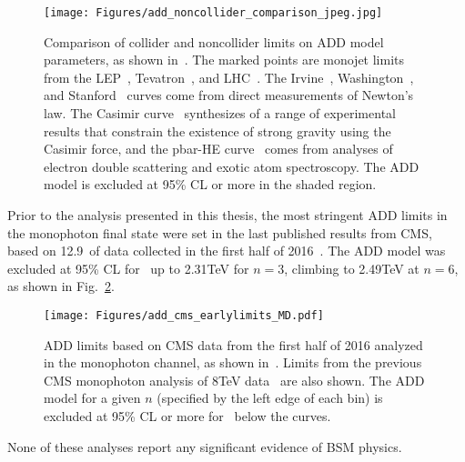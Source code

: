 \begin{figure}[hbtp]
  \begin{center}
    \texttt{[image: Figures/add\_noncollider\_comparison\_jpeg.jpg]}
    \caption{
      Comparison of collider and noncollider limits on ADD model parameters, as shown in~\cite{ref:0264-9381/32/3/033001}.
      The marked points are monojet limits from the LEP~\cite{ref:9789812702227_0266}, Tevatron~\cite{ref:PhysRevLett.101.181602}, and LHC~\cite{ref:j.physletb.2011.10.006, ref:PhysRevLett.110.011802, ref:0264-9381/32/3/033001}.
      The Irvine~\cite{ref:PhysRevD.32.3084, ref:PhysRevLett.44.1645}, Washington~\cite{ref:PhysRevLett.98.021101}, and Stanford~\cite{ref:PhysRevD.78.022002} curves come from direct measurements of Newton's law.
      The Casimir curve~\cite{ref:0264-9381/32/3/033001} synthesizes of a range of  experimental results that constrain the existence of strong gravity using the Casimir force,
      and the pbar-HE curve~\cite{ref:epjconf/20146605021, ref:0264-9381/32/3/033001} comes from analyses of electron double scattering and exotic atom spectroscopy.
      The ADD model is excluded at 95\% CL or more in the shaded region.
    }
    \label{fig:add_noncollider_comparison}
  \end{center}
\end{figure}

Prior to the analysis presented in this thesis, the most stringent ADD limits in the monophoton final state were set in the last published results from CMS,
based on 12.9\fbinv\ of data collected in the first half of 2016~\cite{ref:JHEP10(2017)073}. The ADD model was excluded at 95\% CL for \mD\ up to 2.31\unit{TeV}
for $n = 3$, climbing to 2.49\unit{TeV} at $n = 6$, as shown in Fig.~\ref{fig:add_cms_earlylimits_MD}.

\begin{figure}[hbtp]
  \begin{center}
    \texttt{[image: Figures/add\_cms\_earlylimits\_MD.pdf]}
    \caption{
    ADD limits based on CMS data from the first half of 2016 analyzed in the monophoton channel, as shown in~\cite{ref:JHEP10(2017)073}.
    Limits from the previous CMS monophoton analysis of 8\unit{TeV} data~\cite{ref:j.physletb.2016.01.057} are also shown.
    The ADD model for a given $n$ (specified by the left edge of each bin) is excluded at 95\% CL or more for \mD\ below the curves.
    }
    \label{fig:add_cms_earlylimits_MD}
  \end{center}
\end{figure}

None of these analyses report any significant evidence of BSM physics.
